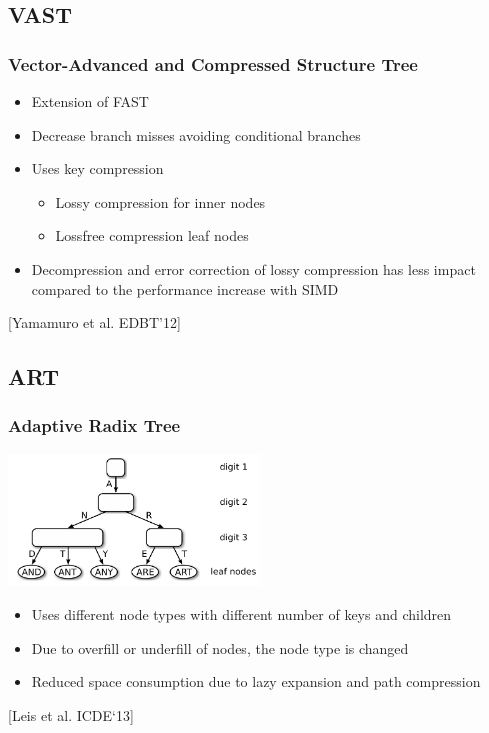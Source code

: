 \documentclass{beamer}
\begin{document}
\subsection{VAST}
\begin{frame}
\frametitle{Vector-Advanced and Compressed Structure Tree}
\begin{itemize}[label=\textbullet,leftmargin=1em]
\item Extension of FAST
\item Decrease branch misses avoiding conditional branches
\item Uses key compression
\begin{itemize}[label=\textbullet,leftmargin=1em]
\item Lossy compression for inner nodes
\item Lossfree compression leaf nodes
\end{itemize}
\item  Decompression and error correction of lossy compression has less impact compared to the performance increase with SIMD
\end{itemize}
\vspace*{\fill}
\begin{center}
\tiny [Yamamuro et al. EDBT’12]
\end{center}
\end{frame}

\subsection{ART}
\begin{frame}
\frametitle{Adaptive Radix Tree}
\begin{center}
\includegraphics[width=0.5\textwidth]{img/art2.pdf}
\end{center}
\begin{itemize}[label=\textbullet,leftmargin=1em]
\item Uses different node types with different number of keys and children
\item Due to overfill or underfill of nodes, the node type is changed
\item Reduced space consumption due to lazy expansion and path compression
\end{itemize}
\begin{center}
\tiny [Leis et al.  ICDE`13]
\end{center}

\end{frame}
\end{document}
